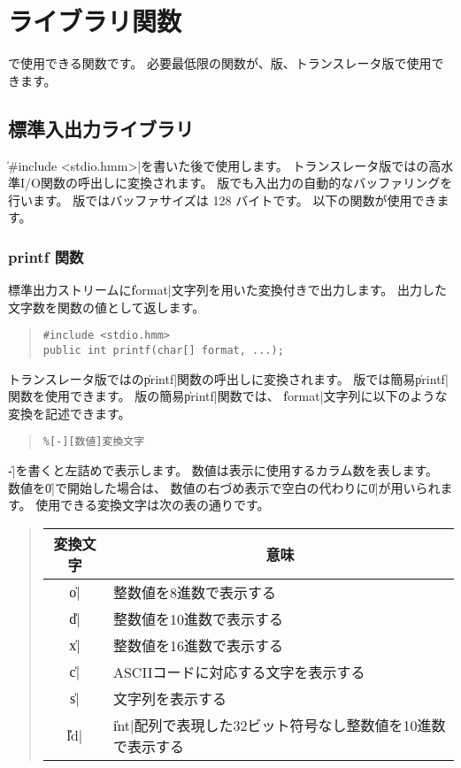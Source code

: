 % 
%
\chapter{ライブラリ関数}

\cmml で使用できる関数です。
必要最低限の関数が、\tac 版、\cl トランスレータ版で使用できます。

\section{標準入出力ライブラリ}
\label{chap4:stdio}

\|#include <stdio.hmm>|を書いた後で使用します。
トランスレータ版では\cl の高水準I/O関数の呼出しに変換されます。
\tac 版でも入出力の自動的なバッファリングを行います。
\tac 版ではバッファサイズは 128 バイトです。
以下の関数が使用できます。

\subsection{printf 関数}

標準出力ストリームに\|format|文字列を用いた変換付きで出力します。
出力した文字数を関数の値として返します。

\begin{quote}
\begin{verbatim}
#include <stdio.hmm>
public int printf(char[] format, ...);
\end{verbatim}
\end{quote}

トランスレータ版では\cl の\|printf|関数の呼出しに変換されます。
\tac 版では簡易\|printf|関数を使用できます。
\tac 版の簡易\|printf|関数では、
\|format|文字列に以下のような変換を記述できます。

\begin{quote}
\begin{verbatim}
%[-][数値]変換文字
\end{verbatim}
\end{quote}

\|-|を書くと左詰めで表示します。
数値は表示に使用するカラム数を表します。
数値を\|0|で開始した場合は、
数値の右づめ表示で空白の代わりに\|0|が用いられます。
使用できる変換文字は次の表の通りです。

\begin{quote}
\begin{tabular}{c|l}
\multicolumn{1}{c|}{変換文字} & \multicolumn{1}{c}{意味} \\\hline
\|o| & 整数値を8進数で表示する \\
\|d| & 整数値を10進数で表示する \\
\|x| & 整数値を16進数で表示する \\
\|c| & ASCIIコードに対応する文字を表示する \\
\|s| & 文字列を表示する \\
\|%
\|ld|& \|int|配列で表現した32ビット符号なし整数値を10進数で表示する \\
\end{tabular}
\end{quote}

